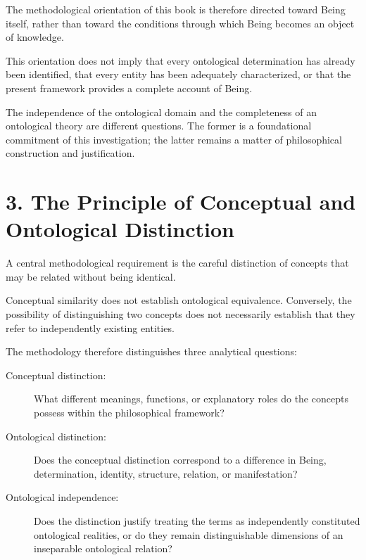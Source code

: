 The methodological orientation of this book
is therefore directed toward Being itself,
rather than toward the conditions through
which Being becomes an object of knowledge.

This orientation does not imply that every
ontological determination has already been
identified, that every entity has been adequately
characterized, or that the present framework
provides a complete account of Being.

The independence of the ontological domain
and the completeness of an ontological theory
are different questions. The former is a
foundational commitment of this investigation;
the latter remains a matter of philosophical
construction and justification.


\section*{3. The Principle of Conceptual and Ontological Distinction}

A central methodological requirement is the
careful distinction of concepts that may be
related without being identical.

Conceptual similarity does not establish
ontological equivalence. Conversely, the
possibility of distinguishing two concepts
does not necessarily establish that they
refer to independently existing entities.

The methodology therefore distinguishes
three analytical questions:

\begin{description}

    \item[Conceptual distinction:]

    What different meanings, functions,
    or explanatory roles do the concepts
    possess within the philosophical framework?

    \item[Ontological distinction:]

    Does the conceptual distinction correspond
    to a difference in Being, determination,
    identity, structure, relation, or manifestation?

    \item[Ontological independence:]

    Does the distinction justify treating
    the terms as independently constituted
    ontological realities, or do they remain
    distinguishable dimensions of an
    inseparable ontological relation?

\end{description}

